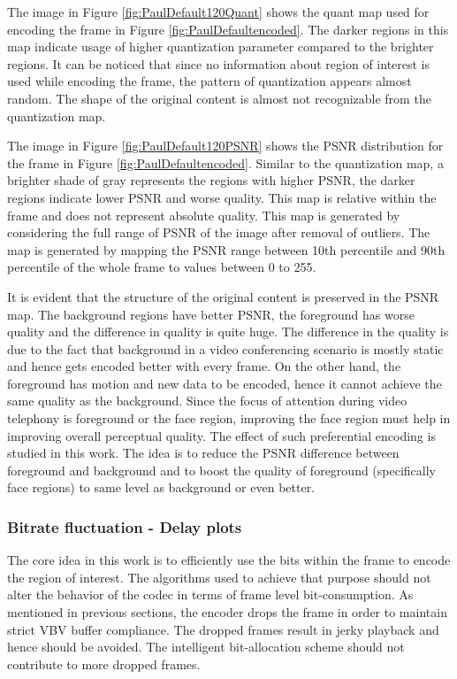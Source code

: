 \documentclass[11pt]{article} %
\begin{document}
The image in Figure \ref{fig:PaulDefault120Quant} shows the quant map used for encoding the frame in Figure \ref{fig:PaulDefaultencoded}. The darker regions in this map indicate usage of higher quantization parameter compared to the brighter regions. It can be noticed that since no information about region of interest is used while encoding the frame, the pattern of quantization appears almost random. The shape of the original content is almost not recognizable from the quantization map.

The image in Figure \ref{fig:PaulDefault120PSNR} shows the PSNR distribution for the frame in Figure \ref{fig:PaulDefaultencoded}. Similar to the quantization map, a brighter shade of gray represents the regions with higher PSNR, the darker regions indicate lower PSNR and worse quality. This map is relative within the frame and does not represent  absolute quality. This map is generated by considering the full range of PSNR of the image after removal of outliers. The map is generated by mapping the PSNR range between 10th percentile and 90th percentile of the whole frame to values between 0 to 255.

It is evident that the structure of the original content is preserved in the PSNR map. The background regions have better PSNR, the foreground has worse quality and the difference in quality is quite huge. The difference in the quality is due to the fact that background in a video conferencing scenario is mostly static and hence gets encoded better with every frame. On the other hand, the foreground has motion and new data to be encoded, hence it cannot achieve the same quality as the background. Since the focus of attention during video telephony is foreground or the face region, improving the face region must help in improving overall perceptual quality. The effect of such preferential encoding is studied in this work. The idea is to reduce the PSNR difference between foreground and background and to boost the quality of foreground (specifically face regions) to same level as background or even better.
\subsubsection{Bitrate fluctuation - Delay plots} \label{sec: setup delay plots}
The core idea in this work is to efficiently use the bits within the frame to encode the region of interest. The algorithms used to achieve that purpose should not alter the behavior of the codec in terms of frame level bit-consumption. As mentioned in previous sections, the encoder drops the frame in order to maintain strict VBV buffer compliance. The dropped frames result in jerky playback and hence should be avoided. The intelligent bit-allocation scheme should not contribute to more dropped frames.
\end{document}

